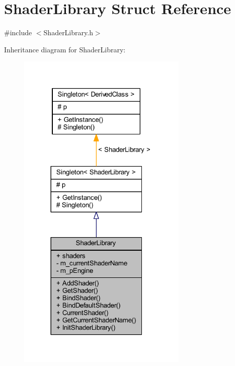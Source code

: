 \hypertarget{struct_shader_library}{}\section{Shader\+Library Struct Reference}
\label{struct_shader_library}


{\ttfamily \#include $<$Shader\+Library.\+h$>$}



Inheritance diagram for Shader\+Library\+:\nopagebreak
\begin{figure}[H]
\begin{center}
\leavevmode
\includegraphics[width=230pt]{struct_shader_library__inherit__graph}
\end{center}
\end{figure}


